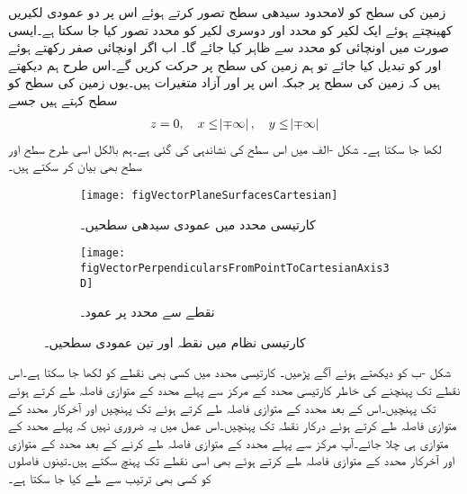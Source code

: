 زمین کی سطح کو لامحدود سیدھی سطح تصور کرتے ہوئے اس پر دو عمودی لکیریں کھینچتے ہوئے ایک لکیر کو  محدد اور دوسری لکیر کو  محدد تصور کیا جا سکتا ہے۔ایسی صورت میں اونچائی کو  محدد سے ظاہر کیا جائے گا۔ اب اگر اونچائی صفر رکھتے ہوئے  اور  کو تبدیل کیا جائے تو ہم زمین کی سطح پر حرکت کریں گے۔اس طرح ہم دیکھتے ہیں کہ زمین کی سطح پر  جبکہ اس پر  اور  آزاد متغیرات ہیں۔یوں زمین کی سطح کو  سطح کہتے ہیں جسے
\begin{align*}
z=0, \quad  x\le \abs{\mp \infty}, \quad y \le \abs{\mp \infty}
\end{align*}
لکھا جا سکتا ہے۔  شکل -الف میں اس سطح کی نشاندہی کی گئی ہے۔ہم بالکل اسی طرح  سطح اور  سطح بھی بیان کر سکتے ہیں۔

\begin{figure}
\begin{subfigure}{0.5\textwidth}
\centering
\texttt{[image: figVectorPlaneSurfacesCartesian]}
\caption{کارتیسی محدد میں عمودی سیدھی سطحیں۔}
\label{شکل_سمتیہ_کارتیسی_عمودی-تین_سطحیں}
\end{subfigure}
%
\begin{subfigure}{0.5\textwidth}
\centering
\texttt{[image: figVectorPerpendicularsFromPointToCartesianAxis3D]}
\caption{نقطے سے محدد پر عمود۔}
\label{شکل_سمتیہ_نقطے_سے_کارتیسی_محدد_پر_عمود}
\end{subfigure}
%
\caption{کارتیسی نظام میں نقطہ اور تین عمودی سطحیں۔}
\label{شکل_سمتیہ_کارتیسی_نقطہ_اور_عمودی_سطحیں}
\end{figure}
شکل  -ب  کو دیکھتے ہوئے آگے  پڑھیں۔ کارتیسی محدد میں کسی بھی نقطے کو  لکھا جا سکتا ہے۔اس نقطے تک پہنچنے کی خاطر  کارتیسی محدد کے مرکز سے پہلے  محدد کے متوازی   فاصلہ طے کرتے ہوئے  تک پہنچیں۔اس کے بعد  محدد کے متوازی  فاصلہ طے کرتے ہوئے  تک پہنچیں  اور آخرکار  محدد کے متوازی  فاصلہ طے کرتے ہوئے درکار نقطہ  تک پہنچیں۔اس عمل میں یہ ضروری نہیں کہ پہلے  محدد کے متوازی ہی چلا جائے۔آپ مرکز سے پہلے  محدد کے متوازی  فاصلہ طے کرنے کے بعد  محدد کے متوازی  اور آخرکار  محدد کے متوازی  فاصلہ طے کرتے ہوئے بھی اسی نقطے تک پہنچ سکتے ہیں۔تینوں فاصلوں کو کسی بھی ترتیب سے طے کیا جا سکتا ہے۔

